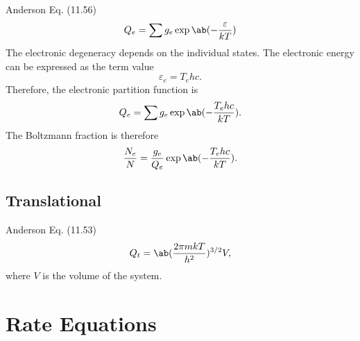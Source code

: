 \documentclass[11pt, twoside, fleqn]{report}
\begin{document}
Anderson Eq. (11.56)
\begin{equation*}
    Q_{e} = \sum g_{e}\exp\ab(-\frac{\varepsilon}{kT})
\end{equation*}
The electronic degeneracy depends on the individual states. The electronic energy can be expressed as the term value
\begin{equation*}
    \varepsilon_{e} = T_{e}hc.
\end{equation*}
Therefore, the electronic partition function is
\begin{equation*}
    Q_{e} = \sum g_{e}\exp\ab(-\frac{T_{e}hc}{kT}).
\end{equation*}
The Boltzmann fraction is therefore
\begin{equation*}
    \frac{N_{e}}{N} = \frac{g_{e}}{Q_{e}}\exp\ab(-\frac{T_{e}hc}{kT}).
\end{equation*}

\subsection{Translational}

Anderson Eq. (11.53)
\begin{equation*}
    Q_{t} = \ab(\frac{2\pi mkT}{h^{2}})^{3/2}V,
\end{equation*}
where $V$ is the volume of the system.

\section{Rate Equations}
\end{document}
